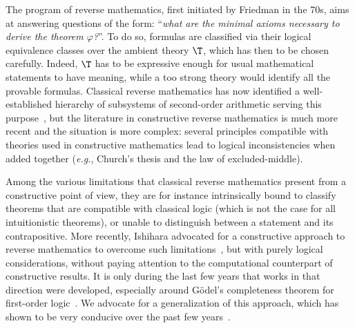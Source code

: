 


The program of reverse mathematics, first initiated by Friedman in the 70s,
aims at answering questions of the form: ``\emph{what are the minimal axioms necessary to derive the theorem $\varphi$?}''.
To do so, formulas are classified via their logical equivalence classes over the ambient theory $\T$, which has then to be chosen carefully.
Indeed, $\T$ has to be expressive enough for usual mathematical statements to have meaning, while a too strong theory would identify all the provable formulas. Classical reverse mathematics has now identified a well-
established hierarchy of subsystems of second-order arithmetic serving this purpose~\cite{Simpson09}, but the literature in constructive reverse mathematics is much more recent and the situation is more complex: several principles compatible with theories used in constructive mathematics lead to logical inconsistencies when added together (\emph{e.g.}, Church’s thesis and the law of excluded-middle).





Among the various limitations that classical reverse mathematics present
from a constructive point of view,  they are for instance intrinsically
bound to classify theorems that are compatible with classical logic (which is not the case for all intuitionistic theorems), or unable to distinguish between a statement and its contrapositive.
More recently, Ishihara advocated for a constructive approach to reverse
mathematics to overcome such limitations~\cite{Ishihara06}, but with
purely logical considerations, without paying attention to the computational counterpart of constructive results.
It is only during the last few years that works in that direction were developed, especially around Gödel's completeness theorem for first-order logic~\cite{HerIli22,ForKirWeh21}.
We advocate for a generalization of this approach, which has shown to be very conducive over the past few years~\cite{KirZen25,CohEtAl24,HerKir24,Bauer22}.


